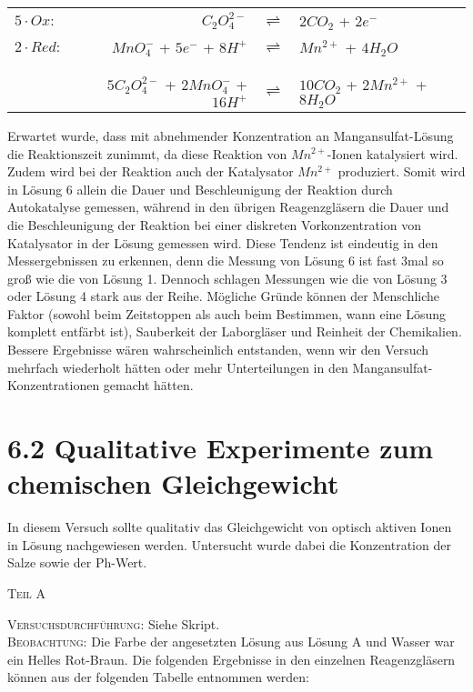 \documentclass[12pt, a4paper]{article}
\def\1{Lösung 1}
\def\3{Lösung 3}
\def\4{Lösung 4}
\def\6{Lösung 6}
\begin{document}
\begin{center}
\begin{tabular}{lrcl}
$5\cdot Ox:$ & $C_2O_4^{2-}$ & $\rightleftharpoons$ & $2CO_2$ + $2e^-$\\
$2\cdot Red:$ & $MnO_4^{-}$ + $ 5e^-$ + $8H^+$ & $\rightleftharpoons$ & $Mn^{2+}$ + $4H_2O$\\
\hline\\
\vspace{-8mm}\\
 & $5C_2O_4^{2-}$ + $2MnO_4^{-}$ + $16H^+$ & $\rightleftharpoons$ & $10CO_2$ + $2Mn^{2+}$ + $8H_2O$\\ 
\end{tabular}
\end{center} Erwartet wurde, dass mit abnehmender Konzentration an Mangansulfat-Lösung die Reaktionszeit zunimmt, da diese Reaktion von $Mn^{2+}$-Ionen katalysiert wird. Zudem wird bei der Reaktion auch der Katalysator $Mn^{2+}$ produziert. Somit wird in \6 allein die Dauer und Beschleunigung der Reaktion durch Autokatalyse gemessen, während in den übrigen Reagenzgläsern die Dauer und die Beschleunigung der Reaktion bei einer diskreten Vorkonzentration von Katalysator in der Lösung gemessen wird. Diese Tendenz ist eindeutig in den Messergebnissen zu erkennen, denn die Messung von \6 ist fast 3mal so groß wie die von \1. Dennoch schlagen Messungen wie die von \3 oder \4 stark aus der Reihe. Mögliche Gründe können der Menschliche Faktor (sowohl beim Zeitstoppen als auch beim Bestimmen, wann eine Lösung komplett entfärbt ist), Sauberkeit der Laborgläser und Reinheit der Chemikalien. Bessere Ergebnisse wären wahrscheinlich entstanden, wenn wir den Versuch mehrfach wiederholt hätten oder mehr Unterteilungen in den Mangansulfat-Konzentrationen gemacht hätten.

\newpage
\section{6.2 Qualitative Experimente zum chemischen Gleichgewicht}

In diesem Versuch sollte qualitativ das Gleichgewicht von optisch aktiven Ionen in Lösung nachgewiesen werden. Untersucht wurde dabei die Konzentration der Salze sowie der Ph-Wert.	
\begin{center}
\textsc{Teil A}
\end{center}
\textsc{Versuchsdurchführung:} Siehe Skript.\\

\textsc{Beobachtung:}\hspace{5mm} Die Farbe der angesetzten Lösung aus Lösung A und Wasser war ein Helles Rot-Braun. Die folgenden Ergebnisse in den einzelnen Reagenzgläsern können aus der folgenden Tabelle entnommen werden:\\
\end{document}
